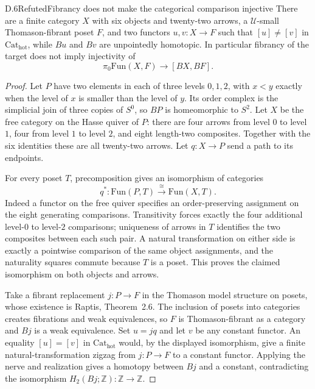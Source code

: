 \begin{claim}{D.6}{Refuted}{Fibrancy does not make the categorical comparison injective}
There are a finite category $X$ with six objects and twenty-two arrows, a $\mathcal U$-small Thomason-fibrant poset $F$, and two functors $u,v:X\to F$ such that $[u]\ne[v]$ in $\mathrm{Cat}_{\mathrm{hot}}$, while $Bu$ and $Bv$ are unpointedly homotopic. In particular fibrancy of the target does not imply injectivity of
\[
 \pi_0\mathrm{Fun}(X,F)\longrightarrow[BX,BF].
\]
\end{claim}
\begin{proof}
Let $P$ have two elements in each of three levels $0,1,2$, with $x<y$ exactly when the level of $x$ is smaller than the level of $y$. Its order complex is the simplicial join of three copies of $S^0$, so $BP$ is homeomorphic to $S^2$. Let $X$ be the free category on the Hasse quiver of $P$: there are four arrows from level $0$ to level $1$, four from level $1$ to level $2$, and eight length-two composites. Together with the six identities these are all twenty-two arrows. Let $q:X\to P$ send a path to its endpoints.

For every poset $T$, precomposition gives an isomorphism of categories
\[
 q^*:\mathrm{Fun}(P,T)\xrightarrow{\cong}\mathrm{Fun}(X,T).
\]
Indeed a functor on the free quiver specifies an order-preserving assignment on the eight generating comparisons. Transitivity forces exactly the four additional level-$0$ to level-$2$ comparisons; uniqueness of arrows in $T$ identifies the two composites between each such pair. A natural transformation on either side is exactly a pointwise comparison of the same object assignments, and the naturality squares commute because $T$ is a poset. This proves the claimed isomorphism on both objects and arrows.

Take a fibrant replacement $j:P\to F$ in the Thomason model structure on posets, whose existence is Raptis, Theorem~2.6. The inclusion of posets into categories creates fibrations and weak equivalences, so $F$ is Thomason-fibrant as a category and $Bj$ is a weak equivalence. Set $u=jq$ and let $v$ be any constant functor. An equality $[u]=[v]$ in $\mathrm{Cat}_{\mathrm{hot}}$ would, by the displayed isomorphism, give a finite natural-transformation zigzag from $j:P\to F$ to a constant functor. Applying the nerve and realization gives a homotopy between $Bj$ and a constant, contradicting the isomorphism $H_2(Bj;\mathbb Z):\mathbb Z\to\mathbb Z$.


\end{proof}
